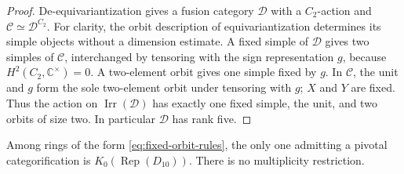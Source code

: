 \begin{proof}
De-equivariantization gives a fusion category $\mathcal D$ with a
$C_2$-action and $\mathcal C\simeq\mathcal D^{C_2}$.
For clarity, the orbit description of equivariantization determines its
simple objects without a dimension estimate. A fixed simple of
$\mathcal D$ gives two simples of $\mathcal C$, interchanged by tensoring
with the sign representation $g$, because $H^2(C_2,\mathbb C^\times)=0$.
A two-element orbit gives one simple fixed by $g$. In \(\mathcal C\), the
unit and $g$ form the sole two-element orbit under tensoring with $g$;
$X$ and $Y$ are fixed. Thus the action on $\operatorname{Irr}(\mathcal D)$
has exactly one fixed simple, the unit, and two orbits of size two.
In particular $\mathcal D$ has rank five.
\end{proof}

\begin{theorem}\label{thm:fixed-orbits-unbounded}
Among rings of the form \eqref{eq:fixed-orbit-rules}, the only one admitting
a pivotal categorification is $K_0(\operatorname{Rep}(D_{10}))$.
There is no multiplicity restriction.
\end{theorem}
